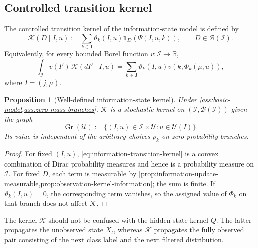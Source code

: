 \documentclass[10pt,twocolumn]{article}
\newtheorem{proposition}{Proposition}
\theoremstyle{remark}
\newcommand{\R}{\mathbb{R}}
\newcommand{\B}{\mathcal{B}}
\newcommand{\Ucal}{\mathcal{U}}
\newcommand{\Ical}{\mathcal{I}}
\newcommand{\one}{\mathbf{1}}
\begin{document}
\subsection{Controlled transition kernel}
\label{subsec:information-transition-kernel}

The controlled transition kernel of the information-state model is defined by
\begin{equation}
	\mathcal K(D\mid I,u)
	:=\sum_{k\in\mathsf J}
	\vartheta_k(I,u)
	\one_D\!\left(\Psi(I,u,k)\right),
	\qquad D\in\B(\Ical).
	\label{eq:information-transition-kernel}
\end{equation}
Equivalently, for every bounded Borel function $v:\Ical\to\R$,
\begin{equation*}
	\int_{\Ical}v(I')\,\mathcal K(dI'\mid I,u)
	=\sum_{k\in\mathsf J}
	\vartheta_k(I,u)
	v\!\left(k,\Phi_k(\mu,u)\right),
	\label{eq:information-kernel-integral}
\end{equation*}
where $I=(j,\mu)$.

\begin{proposition}[Well-defined information-state kernel]
	\label{prop:information-kernel-well-defined}
	Under \cref{ass:basic-model,ass:zero-mass-branches}, $\mathcal K$ is a stochastic kernel on $(\Ical,\B(\Ical))$ given the graph
	\begin{equation}
		\operatorname{Gr}(\Ucal)
		:=\{(I,u)\in\Ical\times\Ucal:u\in\Ucal(I)\}.
		\label{eq:information-action-graph}
	\end{equation}
	Its value is independent of the arbitrary choices $\rho_k$ on zero-probability branches.
\end{proposition}

\begin{proof}
	For fixed $(I,u)$, \cref{eq:information-transition-kernel} is a convex combination of Dirac probability measures and hence is a probability measure on $\Ical$. For fixed $D$, each term is measurable by \cref{prop:information-update-measurable,prop:observation-kernel-information}; the sum is finite. If $\vartheta_k(I,u)=0$, the corresponding term vanishes, so the assigned value of $\Phi_k$ on that branch does not affect $\mathcal K$.
\end{proof}

The kernel $\mathcal K$ should not be confused with the hidden-state kernel $Q$. The latter propagates the unobserved state $X_t$, whereas $\mathcal K$ propagates the fully observed pair consisting of the next class label and the next filtered distribution.
\end{document}
